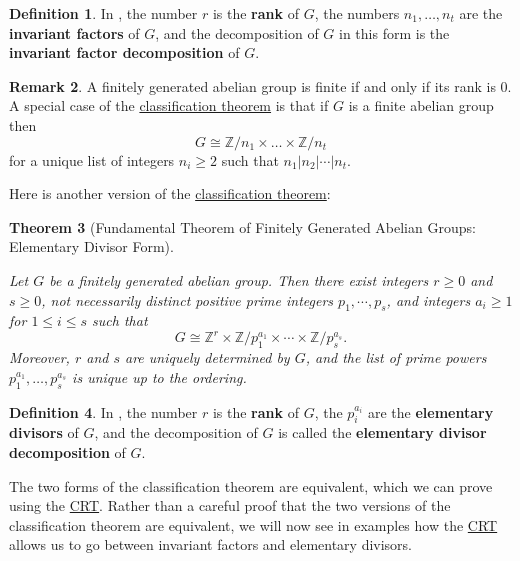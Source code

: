 \documentclass[12pt]{report}
\newtheorem{theorem}{Theorem}[chapter]
\numberwithin{equation}{section}
\numberwithin{theorem}{chapter}
\theoremstyle{definition}
\newtheorem{definition}[theorem]{Definition}
\newtheorem*{basic properties}{Basic Properties}
\newtheorem*{Important Remark}{Important Remark}
\newtheorem{remark}[theorem]{Remark}
\newcommand{\Z}{\mathbb{Z}}
\begin{document}
\begin{definition}
In , the number $r$ is the {\bf rank} of $G$, the numbers $n_1,\ldots,n_t$ are the {\bf invariant factors} of $G$, and the decomposition of $G$ in this form is the {\bf invariant factor decomposition} of $G$.
\end{definition}


\begin{remark} 
A finitely generated abelian group is finite if and only if its rank is $0$. A special case of the \hyperref[finitely generated abelian groups invariant factors]{classification theorem} is that if $G$ is a finite abelian group then
$$G \cong \Z/n_1 \times \dots \times \Z/n_t$$
for a unique list of integers $n_i \geqslant 2$ such that $n_1 | n_2 | \cdots | n_t$.
\end{remark}



Here is another version of the \hyperref[finitely generated abelian groups invariant factors]{classification theorem}:


\begin{theorem}[Fundamental Theorem of Finitely Generated Abelian Groups: Elementary Divisor Form]\label{finitely generated groups elementary divisors}

Let $G$ be a finitely generated abelian group. Then there exist integers $r \geqslant 0$ and $s \geqslant 0$, not necessarily distinct positive prime integers $p_1, \cdots, p_s$, and integers $a_i \geqslant 1$ for $1 \leqslant i \leqslant s$ such that
$$G \cong \Z^r\times \Z/p_1^{a_1} \times \cdots \times \Z/p_s^{a_s}.$$
Moreover, $r$ and $s$ are uniquely determined by $G$, and the list of prime powers $p_1^{a_1}, \dots, p_s^{a_s}$ is unique up to the ordering. 
\end{theorem}


\begin{definition}
In , the number $r$ is the {\bf rank} of $G$, the $p_i^{a_i}$ are the {\bf elementary divisors} of $G$, and the decomposition of $G$ is called the {\bf elementary divisor decomposition} of $G$.
\end{definition}


The two forms of the classification theorem are equivalent, which we can prove using the \hyperref[CRT]{CRT}. Rather than a careful proof that the two versions of the classification theorem are equivalent, we will now see in examples how the \hyperref[CRT]{CRT} allows us to go between invariant factors and elementary divisors.
\end{document}
